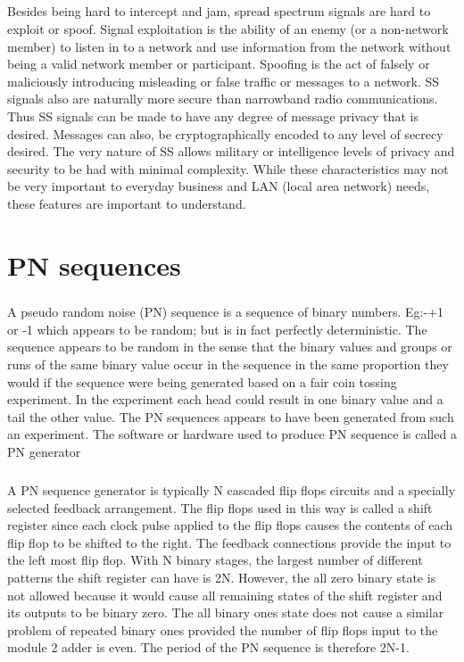 \documentclass[a4paper]{report}
\begin{document}
\paragraph{}
\large\textnormal{Besides being hard to intercept and jam, spread spectrum signals are hard to exploit or spoof. Signal exploitation is the ability of an enemy (or a non-network member) to listen in to a network and use information from the network without being a valid network member or participant. Spoofing is the act of falsely or maliciously introducing misleading or false traffic or messages to a network. SS signals also are naturally more secure than narrowband radio communications. Thus SS signals can be made to have any degree of message privacy that is desired. Messages can also, be cryptographically encoded to any level of secrecy desired. The very nature of SS allows military or intelligence levels of privacy and security to be had with minimal complexity. While these characteristics may not be very important to everyday business and LAN (local area network) needs, these features are important to understand.}

\chapter{PN sequences}
\paragraph{}
\large\textnormal{A pseudo random noise (PN) sequence is a sequence of binary numbers. Eg:-+1 or -1 which appears to be random; but is in fact perfectly deterministic. The sequence appears to be random in the sense that the binary values and groups or runs of the same binary value occur in the sequence in the same proportion they would if the sequence were being generated based on a fair coin tossing experiment. In the experiment each head could result in one binary value and a tail the other value. The PN sequences appears to have been generated from such an experiment. The software or hardware used to produce PN sequence is called a PN generator}
\paragraph{}
\large\textnormal{A PN sequence generator is typically N cascaded flip flops circuits and a specially selected feedback arrangement. The flip flops used in this way is called a shift register since each clock pulse applied to the flip flops causes the contents of each flip flop to be shifted to the right. The feedback connections provide the input to the left most flip flop. With N binary stages, the largest number of different patterns the shift register can have is 2N. However, the all zero binary state is not allowed because it would cause all remaining states of the shift register and its outputs to be binary zero. The all binary ones state does not cause a similar problem of repeated binary ones provided the number of flip flops input to the module 2 adder is even. The period of the PN sequence is therefore 2N-1.}
\end{document}
